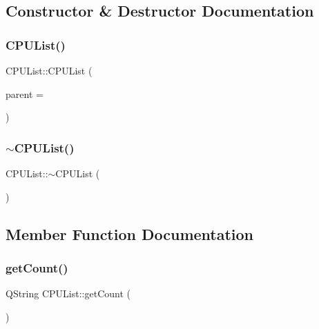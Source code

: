 \subsection{Constructor \& Destructor Documentation}
\mbox{\label{class_c_p_u_list_af8d85299bb17bcd5f1989a907337c0d9}} 
\subsubsection{\texorpdfstring{C\+P\+U\+List()}{CPUList()}}
{\footnotesize\ttfamily C\+P\+U\+List\+::\+C\+P\+U\+List (\begin{DoxyParamCaption}\item[{Q\+Object $\ast$}]{parent = {} }\end{DoxyParamCaption})\hspace{0.3cm}{\ttfamily [explicit]}}

\mbox{\label{class_c_p_u_list_a78f76d52368f52ca8466a7ed1f1a05b4}} 
\subsubsection{\texorpdfstring{$\sim$\+C\+P\+U\+List()}{~CPUList()}}
{\footnotesize\ttfamily C\+P\+U\+List\+::$\sim$\+C\+P\+U\+List (\begin{DoxyParamCaption}{ }\end{DoxyParamCaption})}



\subsection{Member Function Documentation}
\mbox{\label{class_c_p_u_list_a0c172aa998f014f8b01e4a9fd79bb57a}} 
\subsubsection{\texorpdfstring{get\+Count()}{getCount()}}
{\footnotesize\ttfamily Q\+String C\+P\+U\+List\+::get\+Count (\begin{DoxyParamCaption}{ }\end{DoxyParamCaption})}

